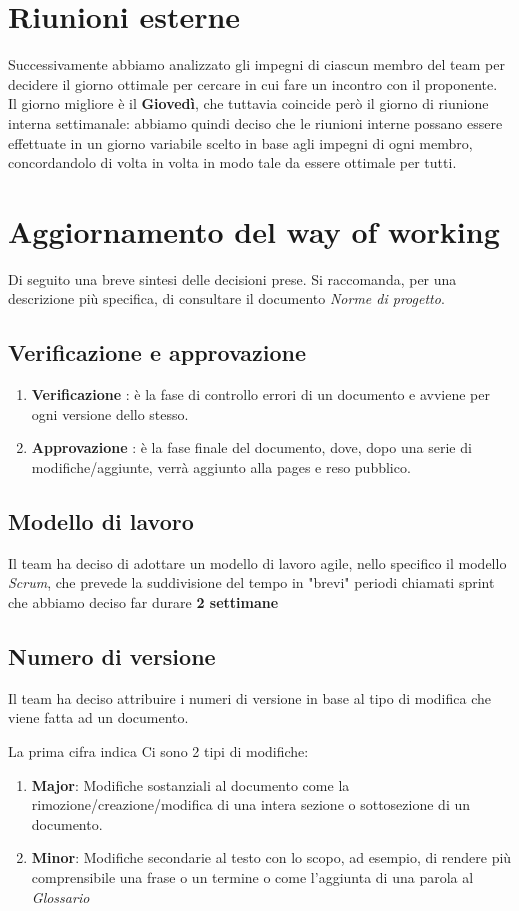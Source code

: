 \section{Riunioni esterne}
Successivamente abbiamo analizzato gli impegni di ciascun membro del team per decidere il giorno ottimale per cercare in cui fare un incontro con il proponente.\\
Il giorno migliore è il \textbf{Giovedì}, che tuttavia coincide però il giorno di riunione interna settimanale: abbiamo quindi deciso che le riunioni interne
possano essere effettuate in un giorno variabile scelto in base agli impegni di ogni membro, concordandolo di volta in volta in modo tale da essere ottimale per tutti. 
\section{Aggiornamento del way of working}
    Di seguito una breve sintesi delle decisioni prese. Si raccomanda, per una descrizione più specifica, di consultare il documento \textit{Norme di progetto}.
    \subsection{Verificazione e approvazione} 
        \begin{enumerate}
            \item \textbf{Verificazione} : è la fase di controllo errori di un documento e avviene per ogni versione dello stesso.
            \item \textbf{Approvazione} : è la fase finale del documento, dove, dopo una serie di modifiche/aggiunte, verrà aggiunto alla pages e reso pubblico.
        \end{enumerate}
    \subsection{Modello di lavoro}
        Il team ha deciso di adottare un modello di lavoro agile, nello specifico il modello \textit{Scrum}, che prevede la suddivisione del tempo in "brevi" periodi chiamati sprint
        che abbiamo deciso far durare \textbf{2 settimane}
    \subsection{Numero di versione}
        Il team ha deciso attribuire i numeri di versione in base al tipo di modifica che viene fatta ad un documento.
        
        La prima cifra indica 
        Ci sono 2 tipi di modifiche:
        \begin{enumerate}
            \item \textbf{Major}: Modifiche sostanziali al documento come la rimozione/creazione/modifica di una intera sezione o sottosezione di un documento.
            \item \textbf{Minor}: Modifiche secondarie al testo con lo scopo, ad esempio, di rendere più comprensibile una frase o un termine o come l'aggiunta di una parola al \textit{Glossario}
        \end{enumerate}
        

